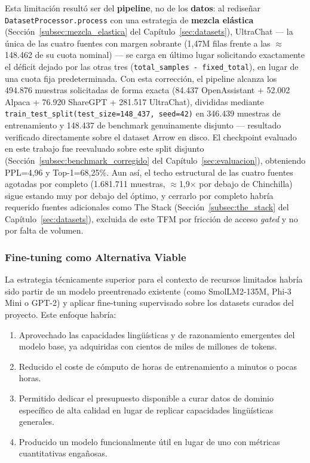 Esta limitación resultó ser del \textbf{pipeline}, no de los \textbf{datos}: al rediseñar \texttt{DatasetProcessor.process} con una estrategia de \textbf{mezcla elástica} (Sección~\ref{subsec:mezcla_elastica} del Capítulo~\ref{sec:datasets}), UltraChat --- la única de las cuatro fuentes con margen sobrante (1,47M filas frente a las $\approx$148.462 de su cuota nominal) --- se carga en último lugar solicitando exactamente el déficit dejado por las otras tres (\texttt{total\_samples - fixed\_total}), en lugar de una cuota fija predeterminada. Con esta corrección, el pipeline alcanza los 494.876 muestras solicitadas de forma exacta (84.437 OpenAssistant + 52.002 Alpaca + 76.920 ShareGPT + 281.517 UltraChat), divididas mediante \texttt{train\_test\_split(test\_size=148\_437, seed=42)} en 346.439 muestras de entrenamiento y 148.437 de benchmark genuinamente disjunto --- resultado verificado directamente sobre el dataset Arrow en disco. El checkpoint evaluado en este trabajo fue reevaluado sobre este split disjunto (Sección~\ref{subsec:benchmark_corregido} del Capítulo~\ref{sec:evaluacion}), obteniendo PPL=4,96 y Top-1=68,25\%. Aun así, el techo estructural de las cuatro fuentes agotadas por completo (1.681.711 muestras, $\approx$1,9$\times$ por debajo de Chinchilla) sigue estando muy por debajo del óptimo, y cerrarlo por completo habría requerido fuentes adicionales como The Stack (Sección~\ref{subsec:the_stack} del Capítulo~\ref{sec:datasets}), excluida de este TFM por fricción de acceso \textit{gated} y no por falta de volumen.

\subsubsection{Fine-tuning como Alternativa Viable}

La estrategia técnicamente superior para el contexto de recursos limitados habría sido partir de un modelo preentrenado existente (como SmolLM2-135M, Phi-3 Mini o GPT-2) y aplicar fine-tuning supervisado sobre los datasets curados del proyecto. Este enfoque habría:

\begin{enumerate}
    \item Aprovechado las capacidades lingüísticas y de razonamiento emergentes del modelo base, ya adquiridas con cientos de miles de millones de tokens.
    \item Reducido el coste de cómputo de horas de entrenamiento a minutos o pocas horas.
    \item Permitido dedicar el presupuesto disponible a curar datos de dominio específico de alta calidad en lugar de replicar capacidades lingüísticas generales.
    \item Producido un modelo funcionalmente útil en lugar de uno con métricas cuantitativas engañosas.
\end{enumerate}

